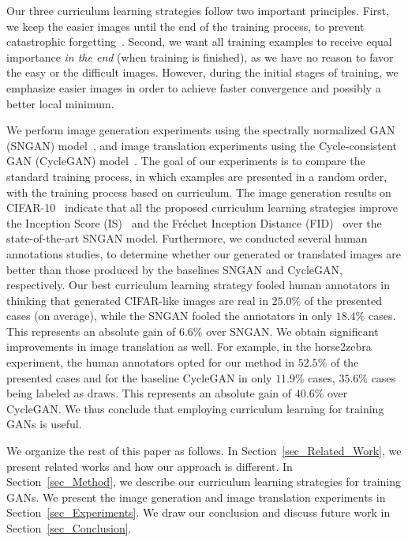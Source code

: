\documentclass[10pt,twocolumn,letterpaper]{article}
\begin{document}
Our three curriculum learning strategies follow two important principles. First, we keep the easier images until the end of the training process, to prevent catastrophic forgetting~\cite{Kirkpatrick-PNAS-2017,McCloskey-PLM-1989}. Second, we want all training examples to receive equal importance \emph{in the end} (when training is finished), as we have no reason to favor the easy or the difficult images. However, during the initial stages of training, we emphasize easier images in order to achieve faster convergence and possibly a better local minimum.

We perform image generation experiments using the spectrally normalized GAN (SNGAN) model~\cite{Miyato-ICLR-2018}, and image translation experiments using the Cycle-consistent GAN (CycleGAN) model~\cite{Zhu-ICCV-2017}. The goal of our experiments is to compare the standard training process, in which examples are presented in a random order, with the training process based on curriculum. The image generation results on CIFAR-10~\cite{Krizhevsky-TR-2009} indicate that all the proposed curriculum learning strategies improve the Inception Score (IS)~\cite{Salimans-NIPS-2016} and the Fr\'echet Inception Distance (FID)~\cite{Heusel-NIPS-2017} over the state-of-the-art SNGAN model. Furthermore, we conducted several human annotations studies, to determine whether our generated or translated images are better than those produced by the baselines SNGAN and CycleGAN, respectively. Our best curriculum learning strategy fooled human annotators in thinking that generated CIFAR-like images are real in $25.0\%$ of the presented cases (on average), while the SNGAN fooled the annotators in only $18.4\%$ cases. This represents an absolute gain of $6.6\%$ over SNGAN. We obtain significant improvements in image translation as well. For example, in the horse2zebra~\cite{Zhu-ICCV-2017} experiment, the human annotators opted for our method in $52.5\%$ of the presented cases and for the baseline CycleGAN in only $11.9\%$ cases, $35.6\%$ cases being labeled as draws. This represents an absolute gain of $40.6\%$ over CycleGAN. We thus conclude that employing curriculum learning for training GANs is useful.

We organize the rest of this paper as follows. In Section~\ref{sec_Related_Work}, we present related works and how our approach is different.
In Section~\ref{sec_Method}, we describe our curriculum learning strategies for training GANs. We present the image generation and image translation experiments in Section~\ref{sec_Experiments}. We draw our conclusion and discuss future work in Section~\ref{sec_Conclusion}.
\end{document}
